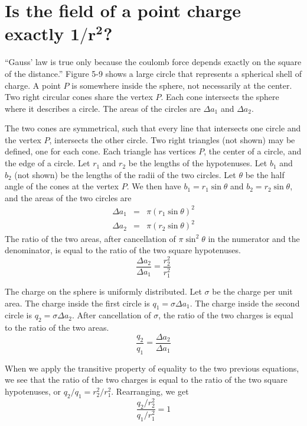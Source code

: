 \section{Is the field of a point charge exactly $\boldsymbol{1/r^2}$?}

``Gauss' law is true only because the coulomb force
depends exactly on the square of the distance.''
Figure 5-9 shows a large circle that represents a spherical shell of charge.
A point $P$ is somewhere inside the sphere, not necessarily at the center.
Two right circular cones share the vertex $P$.
Each cone intersects the sphere where it describes a circle.
The areas of the circles are $\Delta a_1$ and $\Delta a_2$.

The two cones are symmetrical, such that every line that intersects one circle 
and the vertex $P$, intersects the other circle.
Two right triangles (not shown) may be defined, one for each cone.
Each triangle has vertices $P$, the center of a circle, and the edge of a circle.
Let $r_1$ and $r_2$ be the lengths of the hypotenuses.
Let $b_1$ and $b_2$ (not shown) be the lengths of the radii of the two circles.
Let $\theta$ be the half angle of the cones at the vertex $P$.
We then have $b_1 = r_1 \sin \theta$ and $b_2 =r_2 \sin \theta$,
and the areas of the two circles are
\begin{eqnarray*}
  \Delta a_1 &=& \pi (r_1 \sin \theta)^2 \\
  \Delta a_2 &=& \pi (r_2 \sin \theta)^2
\end{eqnarray*}
The ratio of the two areas, after cancellation of $\pi \sin^2 \theta$ 
in the numerator and the denominator, is equal to the ratio of the two square hypotenuses.
\begin{equation*}
  \frac{\Delta a_2}{\Delta a_1} = \frac{r^2_2}{r^2_1}
\end{equation*}

The charge on the sphere is uniformly distributed.
Let $\sigma$ be the charge per unit area.
The charge inside the first circle is $q_1 = \sigma \Delta a_1$.
The charge inside the second circle is $q_2 = \sigma \Delta a_2$.
After cancellation of $\sigma$, the ratio of the two charges
is equal to the ratio of the two areas.
\begin{equation*}
  \frac{q_2}{q_1} = \frac{\Delta a_2}{\Delta a_1} 
\end{equation*}

When we apply the transitive property of equality to the two previous equations,
we see that the ratio of the two charges is equal to the ratio of the two square hypotenuses,
or $q_2/q_1 = r_2^2 / r_1^2$. Rearranging, we get
\begin{equation*}
  \frac{q_2/r_2^2}{q_1/r_1^2} = 1
\end{equation*}

